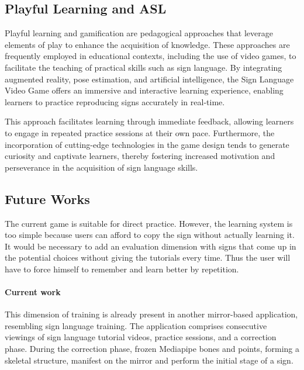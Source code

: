 \subsection{Playful Learning and ASL}


Playful learning and gamification are pedagogical approaches that leverage elements of play to enhance the acquisition of knowledge. These approaches are frequently employed in educational contexts, including the use of video games, to facilitate the teaching of practical skills such as sign language. By integrating augmented reality, pose estimation, and artificial intelligence, the Sign Language Video Game offers an immersive and interactive learning experience, enabling learners to practice reproducing signs accurately in real-time.

This approach facilitates learning through immediate feedback, allowing learners to engage in repeated practice sessions at their own pace. Furthermore, the incorporation of cutting-edge technologies in the game design tends to generate curiosity and captivate learners, thereby fostering increased motivation and perseverance in the acquisition of sign language skills.



\subsection{Future Works}

The current game is suitable for direct practice. However, the learning system is too simple because users can afford to copy the sign without actually learning it. It would be necessary to add an evaluation dimension with signs that come up in the potential choices without giving the tutorials every time. Thus the user will have to force himself to remember and learn better by repetition.

\paragraph{Current work}

This dimension of training is already present in another mirror-based application, resembling sign language training. The application comprises consecutive viewings of sign language tutorial videos, practice sessions, and a correction phase. During the correction phase, frozen Mediapipe bones and points, forming a skeletal structure, manifest on the mirror and perform the initial stage of a sign.

